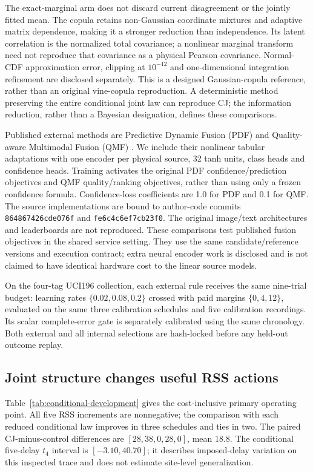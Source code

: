 \documentclass[10pt]{article}
\begin{document}
The exact-marginal arm does not discard current disagreement or the
jointly fitted mean. The copula retains non-Gaussian coordinate mixtures
and adaptive matrix dependence, making it a stronger reduction than
independence. Its latent correlation is the normalized total covariance;
a nonlinear marginal transform need not reproduce that covariance as a
physical Pearson covariance. Normal-CDF approximation error, clipping
at $10^{-12}$ and one-dimensional integration refinement are disclosed
separately. This is a designed Gaussian-copula reference, rather than an
original vine-copula reproduction. A deterministic method preserving the
entire conditional joint law can reproduce CJ; the information reduction,
rather than a Bayesian designation, defines these comparisons.

Published external methods are Predictive Dynamic Fusion (PDF)
\cite{pdf2024} and Quality-aware Multimodal Fusion (QMF)
\cite{qmf2023}. We include their nonlinear tabular adaptations with
one encoder per physical source, 32 tanh units, class heads and confidence
heads. Training activates the original PDF confidence/prediction objectives
and QMF quality/ranking objectives, rather than using only a frozen
confidence formula. Confidence-loss coefficients are 1.0 for PDF and 0.1
for QMF. The source implementations are bound to author-code commits
\texttt{864867426cde076f} and \texttt{fe6c4c6ef7cb23f0}.
The original image/text architectures and leaderboards are not reproduced.
These comparisons test published fusion objectives in the shared service
setting. They use the same candidate/reference versions and execution
contract; extra neural encoder work is disclosed and is not claimed to
have identical hardware cost to the linear source models.

On the four-tag UCI196 collection, each external rule receives the same nine-trial
budget: learning rates $\{0.02,0.08,0.2\}$ crossed with paid margins
$\{0,4,12\}$, evaluated on the same three calibration schedules and five
calibration recordings. Its scalar complete-error gate is separately
calibrated using the same chronology. Both external and all internal
selections are hash-locked before any held-out outcome replay.

\subsection{Joint structure changes useful RSS actions}
Table~\ref{tab:conditional-development} gives the cost-inclusive primary
operating point. All five RSS increments are nonnegative; the comparison
with each reduced conditional law improves in three schedules and ties
in two. The paired CJ-minus-control differences are $[28,38,0,28,0]$,
mean 18.8. The conditional five-delay $t_4$ interval is
$[-3.10,40.70]$; it describes imposed-delay variation on this inspected
trace and does not estimate site-level generalization.
\end{document}
